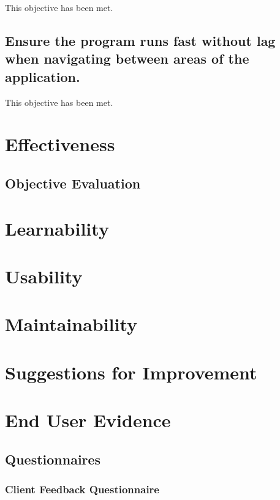 This objective has been met.

\subsection {Ensure the program runs fast without lag when navigating between areas of the application.}  %

This objective has been met.



\section{Effectiveness}

\subsection{Objective Evaluation}

\section{Learnability}

\section{Usability}

\section{Maintainability}

\section{Suggestions for Improvement}

\section{End User Evidence}

\subsection{Questionnaires}

\subsubsection{Client Feedback Questionnaire} %



